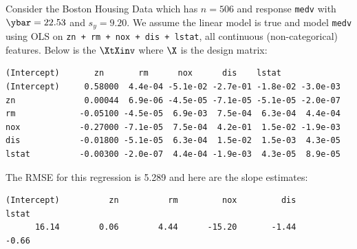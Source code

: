 \documentclass[12pt]{article}
\begin{document}
\problem Consider the Boston Housing Data which has $n = 506$ and response \texttt{medv} with $\ybar = 22.53$ and $s_y = 9.20$. We assume the linear model is true and model \texttt{medv} using OLS on \texttt{zn + rm + nox + dis + lstat}, all continuous (non-categorical) features. Below is the $\XtXinv$ where $\X$ is the design matrix:

\begin{Verbatim}[frame=single, fontsize = \small]
            (Intercept)       zn       rm      nox      dis    lstat
(Intercept)     0.58000  4.4e-04 -5.1e-02 -2.7e-01 -1.8e-02 -3.0e-03
zn              0.00044  6.9e-06 -4.5e-05 -7.1e-05 -5.1e-05 -2.0e-07
rm             -0.05100 -4.5e-05  6.9e-03  7.5e-04  6.3e-04  4.4e-04
nox            -0.27000 -7.1e-05  7.5e-04  4.2e-01  1.5e-02 -1.9e-03
dis            -0.01800 -5.1e-05  6.3e-04  1.5e-02  1.5e-03  4.3e-05
lstat          -0.00300 -2.0e-07  4.4e-04 -1.9e-03  4.3e-05  8.9e-05
\end{Verbatim}

\noindent The RMSE for this regression is 5.289 and here are the slope estimates:


\begin{Verbatim}[frame=single, fontsize = \small]
(Intercept)          zn          rm         nox         dis       lstat 
      16.14        0.06        4.44      -15.20       -1.44       -0.66
\end{Verbatim}

\end{document}
